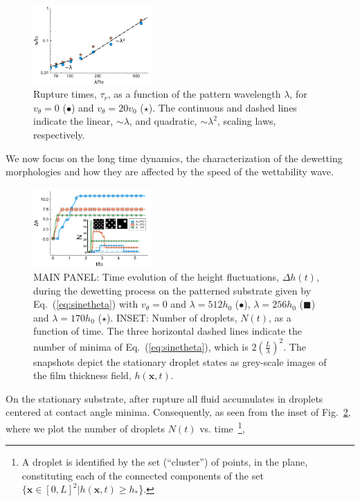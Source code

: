 \documentclass[amsmath,amssymb,showpacs,prf,superscriptaddress, longbibliography]{revtex4-1} %
\begin{document}
\begin{figure}
    \centering
    \includegraphics[width=0.4\textwidth]{Figure_2.pdf}
    \caption{Rupture times, $\tau_r$, as a function of the pattern wavelength $\lambda$, for $v_{\theta}=0$ (\textcolor{jlblue}{$\bullet$}) and $v_{\theta}=20 v_0$ 
    (\textcolor{jlorange}{$\star$}).
    The continuous and dashed lines indicate the linear, $\sim \lambda$, and quadratic, $\sim \lambda^2$, scaling laws, respectively.
        }
    \label{fig:model_rt}
\end{figure}
We now focus on the long time dynamics, the characterization of the dewetting morphologies and how they are affected by the speed of the wettability wave.
\begin{figure}
    \centering
    \includegraphics[width=0.4\textwidth]{Figure_3.pdf}
    \caption{MAIN PANEL: Time evolution of the height fluctuations, $\Delta h(t)$, during the dewetting process on the patterned substrate given by       
    Eq.~(\ref{eq:sinetheta})
    with $v_{\theta}= 0$ and $\lambda= 512 h_0$ (\textcolor{jlblue}{$\bullet$}), $\lambda=256 h_0$ (\textcolor{jlorange}{$\blacksquare$}) and $\lambda=170 h_0$ (\textcolor{jlgreen}{$\star$}). 
    INSET: Number of droplets, $N(t)$, as a function of time. The three horizontal dashed lines indicate the number of minima of Eq.~(\ref{eq:sinetheta}),
      which is $2\left(\frac{L}{\lambda}\right)^2$. The snapshots depict the stationary droplet states as grey-scale images
      of the film thickness field, $h(\mathbf{x},t)$.
      }
    \label{fig:clusters_v0_sine}
\end{figure}
On the stationary substrate, after rupture all fluid accumulates in droplets centered at contact angle minima.
Consequently, as seen from the inset of Fig.~\ref{fig:clusters_v0_sine}, where we plot the number of droplets $N(t)$ vs. time~\footnote{A droplet is identified by the set (``cluster'') of points, in the plane, constituting each of the connected components of the set $\{\mathbf{x} \in [0,L]^2 | h(\mathbf{x},t) \geq h_{\ast}$\}.
},
\end{document}
